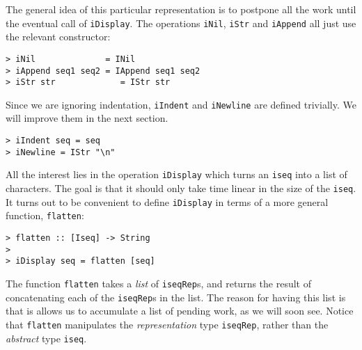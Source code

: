 The general idea of this particular representation
is to postpone all the work until the eventual call of \mbox{\tt iDisplay}.
The operations \mbox{\tt iNil}, \mbox{\tt iStr} and \mbox{\tt iAppend} all just use the relevant
constructor:
\begin{verbatim}
> iNil              = INil
> iAppend seq1 seq2 = IAppend seq1 seq2
> iStr str             = IStr str
\end{verbatim}
%
%
%
Since we are ignoring indentation, \mbox{\tt iIndent} and
\mbox{\tt iNewline} are defined trivially.   We will improve them
in the next section.
\begin{verbatim}
> iIndent seq = seq
> iNewline = IStr "\n"
\end{verbatim}
%
%
All the interest lies in the operation \mbox{\tt iDisplay} which turns an \mbox{\tt iseq} into
a list of characters.  The goal is that it should only take time linear in the
size of the \mbox{\tt iseq}.  It turns out to be convenient to define \mbox{\tt iDisplay} in
terms of a more general function, \mbox{\tt flatten}:
\begin{verbatim}
> flatten :: [Iseq] -> String
>
> iDisplay seq = flatten [seq]
\end{verbatim}
%
%
The function \mbox{\tt flatten} takes a {\em list\/} of \mbox{\tt iseqRep}s, and returns the
result of concatenating each of the \mbox{\tt iseqRep}s in the list.
The reason for having this list is that is allows us to accumulate a list
of pending work, as we will soon see.
Notice that \mbox{\tt flatten} manipulates the {\em representation\/} type \mbox{\tt iseqRep},
rather than the {\em abstract\/} type \mbox{\tt iseq}.

